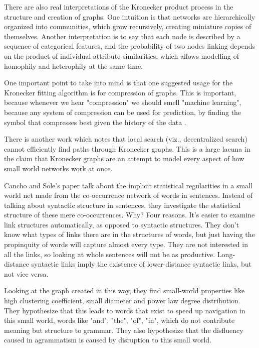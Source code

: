 \documentclass[12pt]{article}
\begin{document}
There are also real interpretations of the Kronecker product process in the structure and creation of graphs. One intuition is that networks are hierarchically organized into communities, which grow recursively, creating miniature copies of themselves. Another interpretation is to say that each node is described by a sequence of categorical features, and the probability of two nodes linking depends on the product of individual attribute similarities, which allows modelling of homophily and heterophily at the same time.

One important point to take into mind is that one suggested usage for the Kronecker fitting algorithm is for compression of graphs. This is important, because whenever we hear "compression" we should smell "machine learning", because any system of compression can be used for prediction, by finding the symbol that compresses best given the history of the data \cite{mlcompression}.

There is another work which notes that local search (viz., decentralized search) cannot efficiently find paths through Kronecker graphs. This is a large lacuna in the claim that Kronecker graphs are an attempt to model every aspect of how small world networks work at once\cite{stochkrongraph}.

Cancho and Sole's paper talk about the implicit statistical regularities in a small world net made from the co-occurrence network of words in sentences. Instead of talking about syntactic structure in sentences, they investigate the statistical structure of these mere co-occurrences. Why? Four reasons. It's easier to examine link structures automatically, as opposed to syntactic structures. They don't know what types of links there are in the structures of words, but just having the propinquity of words will capture almost every type. They are not interested in all the links, so looking at whole sentences will not be as productive. Long-distance syntactic links imply the existence of lower-distance syntactic links, but not vice versa.

Looking at the graph created in this way, they find small-world properties like high clustering coefficient, small diameter and power law degree distribution. They hypothesize that this leads to words that exist to speed up navigation in this small world, words like "and", "the", "of", "in", which do not contribute meaning but structure to grammar. They also hypothesize that the disfluency caused in agrammatism is caused by disruption to this small world.
\end{document}
